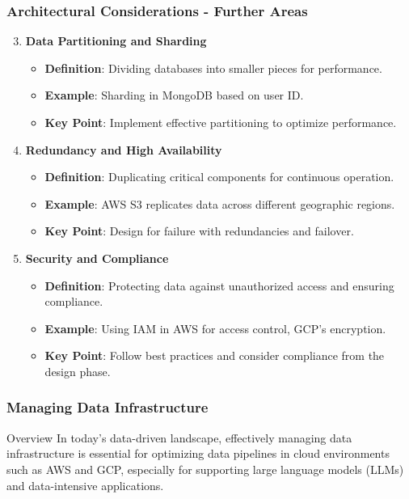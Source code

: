 \documentclass[aspectratio=169]{beamer}
\begin{document}
\begin{frame}[fragile]
    \frametitle{Architectural Considerations - Further Areas}
    \begin{enumerate}
        \setcounter{enumi}{2} %
        \item \textbf{Data Partitioning and Sharding}
            \begin{itemize}
                \item \textbf{Definition}: Dividing databases into smaller pieces for performance.
                \item \textbf{Example}: Sharding in MongoDB based on user ID.
                \item \textbf{Key Point}: Implement effective partitioning to optimize performance.
            \end{itemize}

        \item \textbf{Redundancy and High Availability}
            \begin{itemize}
                \item \textbf{Definition}: Duplicating critical components for continuous operation.
                \item \textbf{Example}: AWS S3 replicates data across different geographic regions.
                \item \textbf{Key Point}: Design for failure with redundancies and failover.
            \end{itemize}
        
        \item \textbf{Security and Compliance}
            \begin{itemize}
                \item \textbf{Definition}: Protecting data against unauthorized access and ensuring compliance.
                \item \textbf{Example}: Using IAM in AWS for access control, GCP's encryption.
                \item \textbf{Key Point}: Follow best practices and consider compliance from the design phase.
            \end{itemize}
    \end{enumerate}
\end{frame}

\begin{frame}[fragile]
    \frametitle{Managing Data Infrastructure}
    \begin{block}{Overview}
        In today's data-driven landscape, effectively managing data infrastructure is essential for optimizing data pipelines in cloud environments such as AWS and GCP, especially for supporting large language models (LLMs) and data-intensive applications.
    \end{block}
\end{frame}
\end{document}
